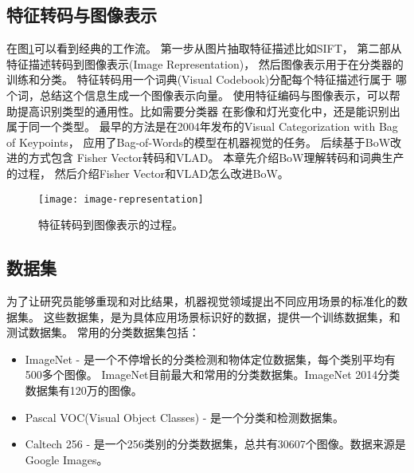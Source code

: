 


\subsection{特征转码与图像表示}
\label{subsubsec:feature-encoding}
在图\ref{fig:image-representation}可以看到经典的工作流。
第一步从图片抽取特征描述比如SIFT，
第二部从特征描述转码到图像表示(Image Representation)，
然后图像表示用于在分类器的训练和分类。
特征转码用一个词典(Visual Codebook)分配每个特征描述行属于
哪个词，总结这个信息生成一个图像表示向量。
使用特征编码与图像表示，可以帮助提高识别类型的通用性。比如需要分类器
在影像和灯光变化中，还是能识别出属于同一个类型。
最早的方法是在2004年发布的Visual Categorization with Bag of Keypoints，
应用了Bag-of-Words的模型在机器视觉的任务。\cite{csurka2004visual}
后续基于BoW改进的方式包含 Fisher Vector转码和VLAD。
\cite{perronnin2007fisher,jegou2010vlad}本章先介绍BoW理解转码和词典生产的过程，
然后介绍Fisher Vector和VLAD怎么改进BoW。
\begin{figure}
  \centering
    \texttt{[image: image-representation]}
    \caption{特征转码到图像表示的过程。}
  \label{fig:image-representation}
\end{figure}


\subsection{数据集}
为了让研究员能够重现和对比结果，机器视觉领域提出不同应用场景的标准化的数据集。
这些数据集，是为具体应用场景标识好的数据，提供一个训练数据集，和测试数据集。
常用的分类数据集包括：
\begin{itemize}
  \item ImageNet - 是一个不停增长的分类检测和物体定位数据集，每个类别平均有500多个图像。
        ImageNet目前最大和常用的分类数据集。ImageNet 2014分类数据集有120万的图像。\cite{deng2009imagenet}
  \item Pascal VOC(Visual Object Classes) - 是一个分类和检测数据集。\cite{everingham2010pascal}
  \item Caltech 256 - 是一个256类别的分类数据集，总共有30607个图像。数据来源是Google Images。\cite{griffin2007caltech}
\end{itemize}
        


